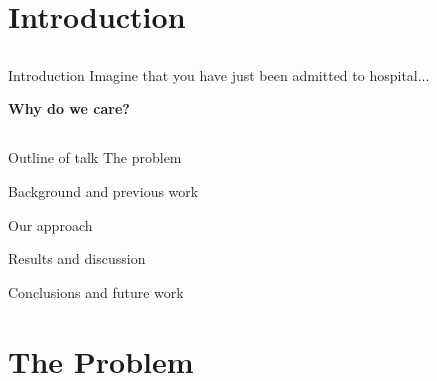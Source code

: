 \documentclass[compress]{beamer}
\begin{document}

\section{Introduction}
\subsection{}
\begin{frame}{Introduction}
Imagine that you have just been admitted to hospital...
  \pause

\vspace{0.5cm}
\textbf{Why do we care?}
\end{frame}

\subsection{}
\begin{frame}{Outline of talk}
The problem

\vspace{0.5cm}
Background and previous work

\vspace{0.5cm}
Our approach

\vspace{0.5cm}
Results and discussion

\vspace{0.5cm}
Conclusions and future work
\end{frame}

\section{The Problem}
\end{document}
